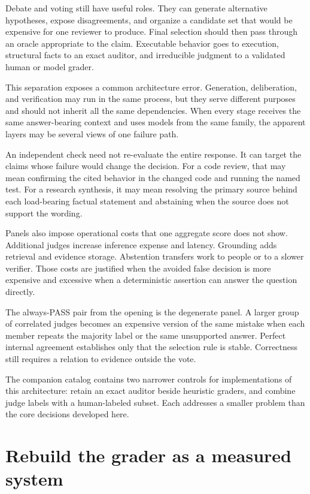 Debate and voting still have useful roles. They can generate alternative hypotheses, expose disagreements, and organize a candidate set that would be expensive for one reviewer to produce. Final selection should then pass through an oracle appropriate to the claim. Executable behavior goes to execution, structural facts to an exact auditor, and irreducible judgment to a validated human or model grader.

This separation exposes a common architecture error. Generation, deliberation, and verification may run in the same process, but they serve different purposes and should not inherit all the same dependencies. When every stage receives the same answer-bearing context and uses models from the same family, the apparent layers may be several views of one failure path.

An independent check need not re-evaluate the entire response. It can target the claims whose failure would change the decision. For a code review, that may mean confirming the cited behavior in the changed code and running the named test. For a research synthesis, it may mean resolving the primary source behind each load-bearing factual statement and abstaining when the source does not support the wording.

Panels also impose operational costs that one aggregate score does not show. Additional judges increase inference expense and latency. Grounding adds retrieval and evidence storage. Abstention transfers work to people or to a slower verifier. Those costs are justified when the avoided false decision is more expensive and excessive when a deterministic assertion can answer the question directly.

The always-PASS pair from the opening is the degenerate panel. A larger group of correlated judges becomes an expensive version of the same mistake when each member repeats the majority label or the same unsupported answer. Perfect internal agreement establishes only that the selection rule is stable. Correctness still requires a relation to evidence outside the vote.

The companion catalog contains two narrower controls for implementations of this architecture: retain an exact auditor beside heuristic graders, and combine judge labels with a human-labeled subset. Each addresses a smaller problem than the core decisions developed here.

\hypertarget{rebuild-the-grader-as-a-measured-system}{%
\section{Rebuild the grader as a measured system}\label{rebuild-the-grader-as-a-measured-system}}


